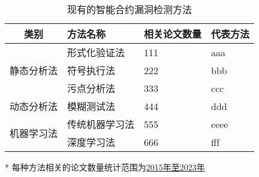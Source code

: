 \begin{table}[htbp]
    \caption{\label{tab:defect_detection_methods}现有的智能合约漏洞检测方法}
    \small
    \begin{threeparttable}
        {
            \renewcommand{\arraystretch}{1.5}
        \begin{tabularx}{\linewidth}{cX<{\centering}X<{\centering}X<{\centering}}
            \toprule
            类别                     & 方法名称   & 相关论文数量 & 代表方法 \\ \midrule
            \multirow{3}{*}{静态分析法} & 形式化验证法 & 111    & aaa  \\
                                   & 符号执行法  & 222    & bbb  \\
                                   & 污点分析法  & 333    & ccc  \\ \midrule
            动态分析法                  & 模糊测试法  & 444    & ddd  \\ \midrule
            \multirow{2}{*}{机器学习法} & 传统机器学习法  & 555    & eeee \\
                                   & 深度学习法  & 666    & fff  \\ \bottomrule
        \end{tabularx}
        }
        \begin{tablenotes}
            \footnotesize
            \item[*] 每种方法相关的论文数量统计范围为\underline{2015年至2023年}
        \end{tablenotes}
    \end{threeparttable}
\end{table}

